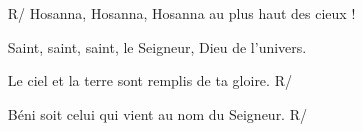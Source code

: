 \begin{itemize}
\item[R/] Hosanna, Hosanna, Hosanna au plus haut des cieux !
\item[]
Saint, saint, saint, le Seigneur, Dieu de l'univers.
\item[]
Le ciel et la terre sont remplis de ta gloire. R/
\item[]
Béni soit celui qui vient au nom du Seigneur. R/
\end{itemize}
